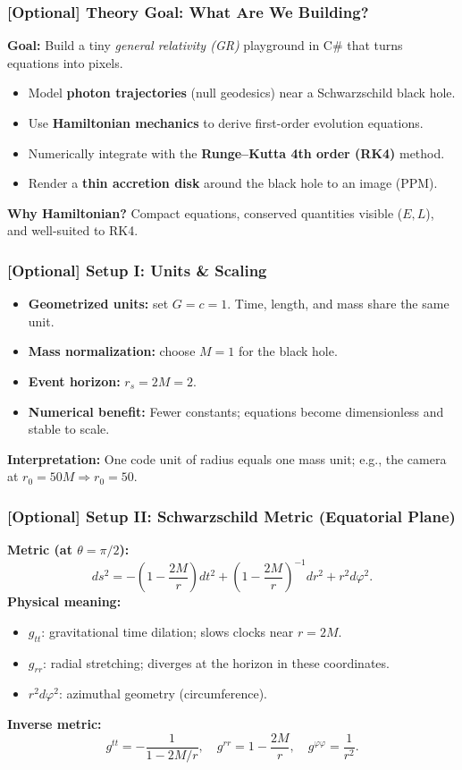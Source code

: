 \documentclass[aspectratio=169]{beamer}
\newcommand{\ProgressStep}[1]{\progressstep{#1}}
\newcommand{\ThisFrameTitle}[1]{\frametitle{#1}}
\begin{document}
\begin{frame}
  \ProgressStep{-1}\ThisFrameTitle{[Optional] Theory Goal: What Are We Building?}
  \textbf{Goal:} Build a tiny \emph{general relativity (GR)} playground in C\# that turns equations into pixels.\\[0.6em]
  \begin{itemize}
    \item Model \textbf{photon trajectories} (null geodesics) near a Schwarzschild black hole.
    \item Use \textbf{Hamiltonian mechanics} to derive first-order evolution equations.
    \item Numerically integrate with the \textbf{Runge–Kutta 4th order (RK4)} method.
    \item Render a \textbf{thin accretion disk} around the black hole to an image (PPM).
  \end{itemize}
  \textbf{Why Hamiltonian?} Compact equations, conserved quantities visible (\(E, L\)), and well-suited to RK4.
\end{frame}

\begin{frame}
  \ProgressStep{-1}\ThisFrameTitle{[Optional] Setup I: Units \& Scaling}
  \begin{itemize}
    \item \textbf{Geometrized units:} set \(G=c=1\). Time, length, and mass share the same unit.
    \item \textbf{Mass normalization:} choose \(M=1\) for the black hole.
    \item \textbf{Event horizon:} \(r_s = 2M = 2\).
    \item \textbf{Numerical benefit:} Fewer constants; equations become dimensionless and stable to scale.
  \end{itemize}
  \vspace{0.4em}
  \textbf{Interpretation:} One code unit of radius equals one mass unit; e.g., the camera at \(r_0=50M\Rightarrow r_0=50\).
\end{frame}

\begin{frame}
  \ProgressStep{-1}\ThisFrameTitle{[Optional] Setup II: Schwarzschild Metric (Equatorial Plane)}
  \textbf{Metric (at \(\theta=\pi/2\)):}
  \[
    ds^2
    = -\!\left(1-\frac{2M}{r}\right) dt^2
    + \left(1-\frac{2M}{r}\right)^{-1} dr^2
    + r^2 d\varphi^2 .
  \]
  \textbf{Physical meaning:}
  \begin{itemize}
    \item \(g_{tt}\): gravitational time dilation; slows clocks near \(r=2M\).
    \item \(g_{rr}\): radial stretching; diverges at the horizon in these coordinates.
    \item \(r^2 d\varphi^2\): azimuthal geometry (circumference).
  \end{itemize}
  \textbf{Inverse metric:}
  \[
    g^{tt}=-\frac{1}{1-2M/r},\quad
    g^{rr}=1-\frac{2M}{r},\quad
    g^{\varphi\varphi}=\frac{1}{r^2}.
  \]
\end{frame}
\end{document}

